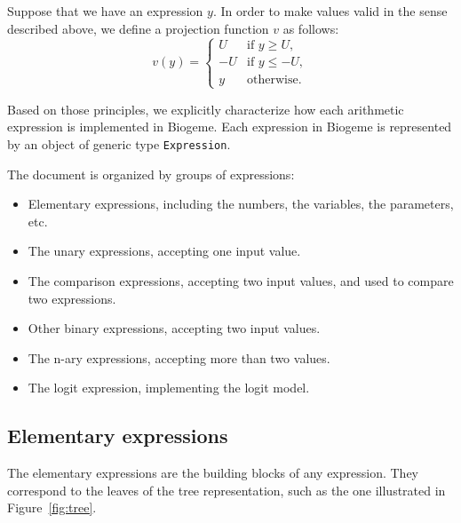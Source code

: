 \documentclass[12pt,a4paper]{article}
\begin{document}
Suppose that we have an expression $y$.
In order to make values valid in the sense described above, we define a projection function $v$ as follows:
\begin{equation}
\label{eq:validation}
v(y) = \left\{
\begin{array}{ll}
  U & \text{if } y \geq U, \\ 
  -U & \text{if } y \leq -U, \\
  y & \text{otherwise}.
\end{array}
\right.
\end{equation}

Based on those principles, we explicitly characterize how each
arithmetic expression is implemented in Biogeme. Each expression in
Biogeme is represented by an object of generic type
\lstinline+Expression+.



The document is organized by groups of expressions:
\begin{itemize}
\item Elementary expressions, including the numbers, the variables, the parameters, etc.
\item The unary expressions, accepting one input value.
\item The comparison expressions, accepting two input values, and used to compare two expressions.
\item Other binary expressions, accepting two input values.
\item The n-ary expressions, accepting more than two values.
\item The logit expression, implementing the logit model.
\end{itemize}



\subsection{Elementary expressions}

The elementary expressions are the building blocks of any expression. They correspond to the leaves of the tree representation, such as the one illustrated in Figure~\ref{fig:tree}.  
\end{document}
